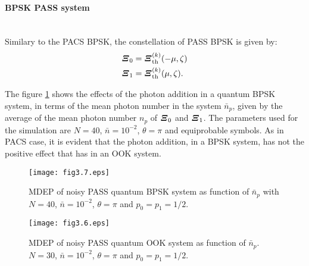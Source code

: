         \paragraph{BPSK PASS system}\mbox{}\\
        Similary to the PACS BPSK, the constellation of PASS BPSK is given by:
        \begin{subequations}
            \begin{align}
                \Operator{\varXi}_0 &= \Operator{\varXi}_{\mathrm{th}}^{(k)}(-\mu,\zeta)\\
                \Operator{\varXi}_1 &= \Operator{\varXi}_{\mathrm{th}}^{(k)}(\mu,\zeta).
            \end{align}
        \end{subequations}
        
        The figure \ref{fig:3.7} shows the effects of the photon addition in a quantum BPSK
        system, in terms of the mean photon number in the system $\bar{n}_p$, given by the average of 
        the mean photon number $n_p$ of $\Operator{\varXi}_0$ and $\Operator{\varXi}_1$. The parameters used
        for the simulation are $N=40$, $\bar{n}=10^{-2}$, $\theta=\pi$ and equiprobable symbols.
        As in PACS case, it is evident that the photon addition, in a BPSK system, has not
        the positive effect that has in an OOK system.
        \begin{figure}[t]
            \begin{center}
                \texttt{[image: fig3.7.eps]}
                \caption{MDEP of noisy PASS quantum BPSK system as function of $\bar{n}_p$ with
                $N=40$, $\bar{n}=10^{-2}$, $\theta=\pi$ and $p_0=p_1=1/2$.}
                \label{fig:3.7}
            \end{center}
        \end{figure}
        \begin{figure}[t]
            \begin{center}
                \texttt{[image: fig3.6.eps]}
                \caption{MDEP of noisy PASS quantum OOK system as function of $\bar{n}_p$.\\
                $N=30$, $\bar{n}=10^{-2}$, $\theta=\pi$ and $p_0=p_1=1/2$.}
                \label{fig:3.6}
            \end{center}
        \end{figure}